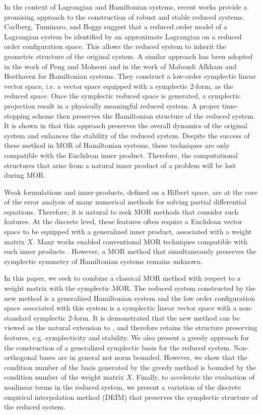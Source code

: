 In the context of Lagrangian and Hamiltonian systems, recent works provide a promising approach to the construction of robust and stable reduced systems. Carlberg, Tuminaro, and Boggs \cite{Carlberg:2014ky} suggest that a reduced order model of a Lagrangian system be identified by an approximate Lagrangian on a reduced order configuration space. This allows the reduced system to inherit the geometric structure of the original system. A similar approach has been adopted in the work of Peng and Mohseni \cite{doi:10.1137/140978922} and in the work of Maboudi Afkham and Hesthaven \cite{doi:10.1137/17M1111991} for Hamiltonian systems. They construct a low-order symplectic linear vector space, i.e. a vector space equipped with a symplectic 2-form, as the reduced space. Once the symplectic reduced space is generated, a symplectic projection result in a physically meaningful reduced system. A proper time-stepping scheme then preserves the Hamiltonian structure of the reduced system. It is shown in \cite{doi:10.1137/17M1111991,doi:10.1137/140978922} that this approach preserves the overall dynamics of the original system and enhances the stability of the reduced system. Despite the success of these method in MOR of Hamiltonian systems, these techniques are only compatible with the Euclidean inner product. Therefore, the computational structures that arise from a natural inner product of a problem will be lost during MOR.

Weak formulations and inner-products, defined on a Hilbert space, are at the core of the error analysis of many numerical methods for solving partial differential equations. Therefore, it is natural to seek MOR methods that consider such features. At the discrete level, these features often require a Euclidean vector space to be equipped with a generalized inner product, associated with a weight matrix $X$. Many works enabled conventional MOR techniques compatible with such inner products \cite{sen2006natural}. However, a MOR method that simultaneously preserves the symplectic symmetry of Hamiltonian systems remains unknown. 

In this paper, we seek to combine a classical MOR method with respect to a weight matrix with the symplectic MOR. The reduced system constructed by the new method is a generalized Hamiltonian system and the low order configuration space associated with this system is a symplectic linear vector space with a non-standard symplectic 2-form. It is demonstrated that the new method can be viewed as the natural extension to \cite{doi:10.1137/17M1111991}, and therefore retains the structure preserving features, e.g. symplecticity and stability. We also present a greedy approach for the construction of a generalized symplectic basis for the reduced system. Non-orthogonal bases are in general not norm bounded. However, we show that the condition number of the basis generated by the greedy method is bounded by the condition number of the weight matrix $X$. Finally, to accelerate the evaluation of nonlinear terms in the reduced system, we present a variation of the discrete empirical interpolation method (DEIM) that preserves the symplectic structure of the reduced system.

